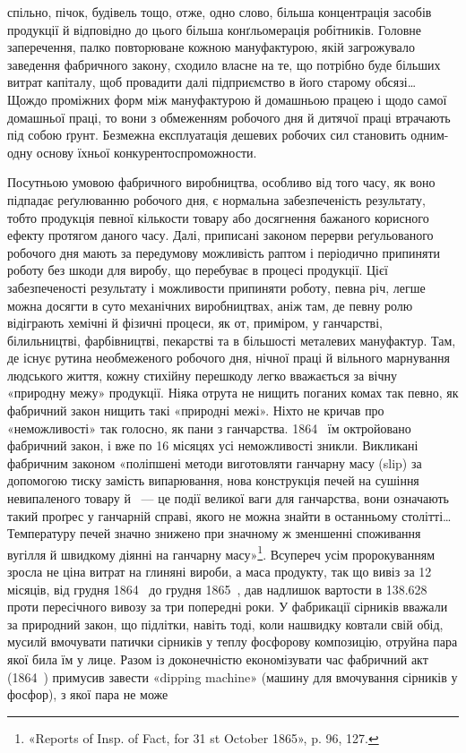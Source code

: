 \parcont{}  %
спільно, пічок, будівель тощо, отже, одно слово, більша концентрація
засобів продукції й відповідно до цього більша конґльомерація
робітників. Головне заперечення, палко повторюване
кожною мануфактурою, якій загрожувало заведення фабричного
закону, сходило власне на те, що потрібно буде більших витрат
капіталу, щоб провадити далі підприємство в його старому обсязі\dots{}
Щождо проміжних форм між мануфактурою й домашньою працею
і щодо самої домашньої праці, то вони з обмеженням робочого
дня й дитячої праці втрачають під собою ґрунт. Безмежна експлуатація
дешевих робочих сил становить одним-одну основу їхньої
конкурентоспроможности.

Посутньою умовою фабричного виробництва, особливо від того
часу, як воно підпадає реґулюванню робочого дня, є нормальна
забезпеченість результату, тобто продукція певної кількости товару
або досягнення бажаного корисного ефекту протягом даного
часу. Далі, приписані законом перерви реґульованого робочого
дня мають за передумову можливість раптом і періодично припиняти
роботу без шкоди для виробу, що перебуває в процесі продукції.
Цієї забезпеченості результату і можливости припиняти
роботу, певна річ, легше можна досягти в суто механічних виробництвах,
аніж там, де певну ролю відіграють хемічні й фізичні
процеси, як от, приміром, у ганчарстві, білильництві, фарбівництві,
пекарстві та в більшості металевих мануфактур. Там, де
існує рутина необмеженого робочого дня, нічної праці й вільного
марнування людського життя, кожну стихійну перешкоду легко
вважається за вічну «природну межу» продукції. Ніяка отрута
не нищить поганих комах так певно, як фабричний закон нищить
такі «природні межі». Ніхто не кричав про «неможливості» так
голосно, як пани з ганчарства. 1864~ їм октройовано фабричний
закон, і вже по 16 місяцях усі неможливості зникли. Викликані
фабричним законом «поліпшені методи виготовляти ганчарну
масу (slip) за допомогою тиску замість випарювання, нова конструкція
печей на сушіння невипаленого товару й~ — це
події великої ваги для ганчарства, вони означають такий проґрес
у ганчарній справі, якого не можна знайти в останньому столітті\dots{}
Температуру печей значно знижено при значному ж зменшенні
споживання вугілля й швидкому діянні на ганчарну масу»\footnote{
«Reports of Insp. of Fact, for 31 st October 1865», p. 96, 127.
}.
Всупереч усім пророкуванням зросла не ціна витрат на глиняні
вироби, а маса продукту, так що вивіз за 12 місяців, від грудня
1864~ до грудня 1865~, дав надлишок вартости в \num{138.628} проти пересічного вивозу за три попередні роки. У фабрикації
сірників вважали за природний закон, що підлітки,
навіть тоді, коли нашвидку ковтали свій обід, мусилй вмочувати
патички сірників у теплу фосфорову композицію, отруйна пара
якої била їм у лице. Разом із доконечністю економізувати час
фабричний акт (1864~) примусив завести «dipping machine»
(машину для вмочування сірників у фосфор), з якої пара не може
\parbreak{}  %

